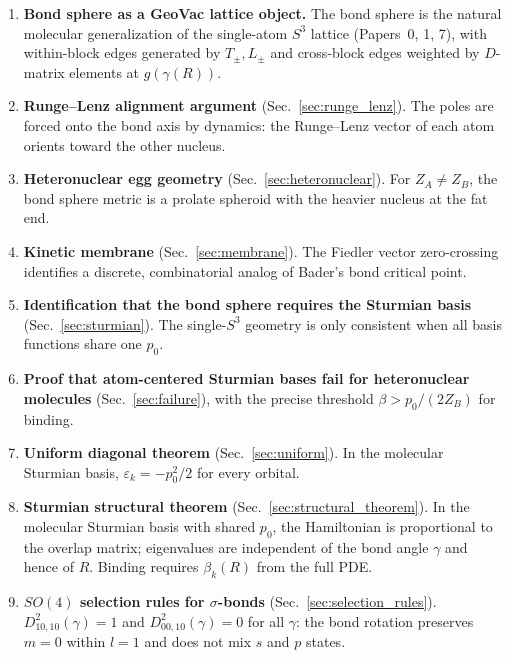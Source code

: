 \documentclass[aps,pra,twocolumn,superscriptaddress,longbibliography]{revtex4-2}
\begin{document}
\begin{enumerate}

\item \textbf{Bond sphere as a GeoVac lattice object.}  The bond
sphere is the natural molecular generalization of the single-atom
$S^3$ lattice (Papers~0, 1, 7), with within-block edges generated by
$T_\pm, L_\pm$ and cross-block edges weighted by $D$-matrix elements
at $g(\gamma(R))$.

\item \textbf{Runge--Lenz alignment argument}
(Sec.~\ref{sec:runge_lenz}).  The poles are forced onto the bond axis
by dynamics: the Runge--Lenz vector of each atom orients toward the
other nucleus.

\item \textbf{Heteronuclear egg geometry}
(Sec.~\ref{sec:heteronuclear}).  For $Z_A \neq Z_B$, the bond sphere
metric is a prolate spheroid with the heavier nucleus at the fat end.

\item \textbf{Kinetic membrane} (Sec.~\ref{sec:membrane}).  The
Fiedler vector zero-crossing identifies a discrete, combinatorial
analog of Bader's bond critical point.

\item \textbf{Identification that the bond sphere requires the
Sturmian basis} (Sec.~\ref{sec:sturmian}).  The single-$S^3$ geometry
is only consistent when all basis functions share one $p_0$.

\item \textbf{Proof that atom-centered Sturmian bases fail for
heteronuclear molecules} (Sec.~\ref{sec:failure}), with the precise
threshold $\beta > p_0/(2Z_B)$ for binding.

\item \textbf{Uniform diagonal theorem}
(Sec.~\ref{sec:uniform}).  In the molecular Sturmian basis,
$\varepsilon_k = -p_0^2/2$ for every orbital.

\item \textbf{Sturmian structural theorem}
(Sec.~\ref{sec:structural_theorem}).  In the molecular Sturmian basis
with shared $p_0$, the Hamiltonian is proportional to the overlap
matrix; eigenvalues are independent of the bond angle $\gamma$ and
hence of $R$.  Binding requires $\beta_k(R)$ from the full PDE.

\item \textbf{$SO(4)$ selection rules for $\sigma$-bonds}
(Sec.~\ref{sec:selection_rules}).
$D^2_{10,10}(\gamma) = 1$ and $D^2_{00,10}(\gamma) = 0$ for all
$\gamma$: the bond rotation preserves $m = 0$ within $l = 1$ and does
not mix $s$ and $p$ states.

\end{enumerate}
\end{document}
